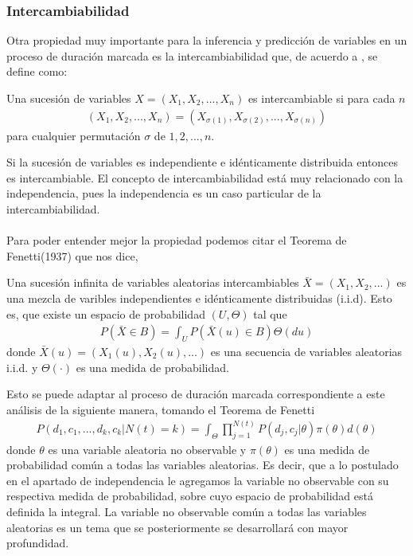 \subsubsection{Intercambiabilidad}
Otra propiedad muy importante para la inferencia y predicci\'on de variables en un proceso de duraci\'on marcada es la intercambiabilidad que, de acuerdo a \cite{hahn2012exchangeable}, se define como:
\begin{defi}
Una sucesi\'on de variables $X=(X_1,X_2,...,X_n)$ es intercambiable si para cada $n$ 
\begin{align}
(X_1,X_2,...,X_n)=(X_{\sigma(1)},X_{\sigma(2)},...,X_{\sigma(n)}) \nonumber
\end{align}
para cualquier permutaci\'on $\sigma$ de $1,2,...,n$.
\end{defi}
Si la sucesi\'on de variables es independiente e id\'enticamente distribuida entonces es intercambiable. El concepto de intercambiabilidad est\'a muy relacionado con la independencia, pues la independencia es un caso particular de la intercambiabilidad.\\
\\
Para poder entender mejor la propiedad podemos citar el Teorema de Fenetti(1937) que nos dice,
\begin{teo}
Una sucesi\'on infinita de variables aleatorias intercambiables $\bar{X}=(X_1,X_2,...)$ es una mezcla de varibles independientes e id\'enticamente distribuidas (i.i.d). Esto es, que existe un espacio de probabilidad $(U,\Theta)$ tal que
\begin{align}
P(\bar{X} \in B)=\int_U P(\bar{X}(u) \in B) \Theta(du)   \nonumber
\end{align}
donde $\bar{X}(u)=(X_1(u),X_2(u),...)$ es una secuencia de variables aleatorias i.i.d. y $\Theta(\cdot)$ es una medida de probabilidad.
\end{teo}
Esto se puede adaptar al proceso de duraci\'on marcada correspondiente a este an\'alisis de la siguiente manera, tomando el Teorema de Fenetti
\begin{align}
P(d_1,c_1,...,d_k,c_k|N(t)=k)=\int_\Theta \prod_{j=1}^{N(t)} P(d_j,c_j|\theta) \pi(\theta) d(\theta)
\end{align}
donde $\theta$ es una variable aleatoria no observable y $\pi(\theta)$ es una medida de probabilidad com\'un a todas las variables aleatorias. Es decir, que a lo postulado en el apartado de independencia le agregamos la variable no observable con su respectiva medida de probabilidad, sobre cuyo espacio de probabilidad est\'a definida la integral. La variable no observable com\'un a todas las variables aleatorias es un tema que se posteriormente se desarrollar\'a con mayor profundidad.
